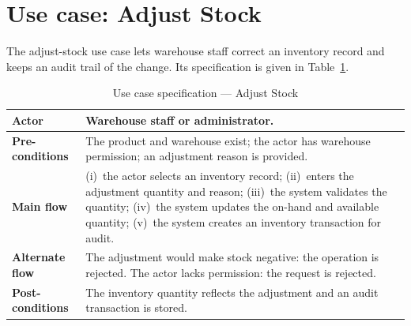 \section*{Use case: Adjust Stock}
The adjust-stock use case lets warehouse staff correct an inventory record and
keeps an audit trail of the change. Its specification is given in
Table~\ref{tab:uc-adjust}.
\begin{table}[H]\centering
\caption{Use case specification --- Adjust Stock}
\label{tab:uc-adjust}
\begin{tabular}{|p{3cm}|p{11cm}|}
\hline
\textbf{Actor} & Warehouse staff or administrator. \\ \hline
\textbf{Pre-conditions} & The product and warehouse exist; the actor has warehouse permission; an adjustment reason is provided. \\ \hline
\textbf{Main flow} & (i)~the actor selects an inventory record; (ii)~enters the adjustment quantity and reason; (iii)~the system validates the quantity; (iv)~the system updates the on-hand and available quantity; (v)~the system creates an inventory transaction for audit. \\ \hline
\textbf{Alternate flow} & The adjustment would make stock negative: the operation is rejected. The actor lacks permission: the request is rejected. \\ \hline
\textbf{Post-conditions} & The inventory quantity reflects the adjustment and an audit transaction is stored. \\ \hline
\end{tabular}
\end{table}

